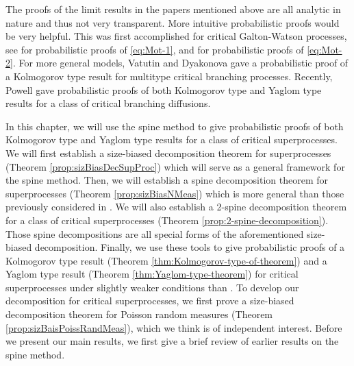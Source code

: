 \documentclass[UTF8]{pkuthss}
\theoremstyle{plain}
\theoremstyle{definition}
\numberwithin{equation}{section}
\begin{document}
	The proofs of the limit results in the papers mentioned above 
	are all analytic in nature and thus not very transparent.
	More intuitive probabilistic proofs would be very helpful.
	This was first accomplished for critical Galton-Watson processes, see \cite{Geiger1999Elementary, LyonsPemantlePeres1995Conceptual} for probabilistic proofs of \eqref{eq:Mot-1}, and \cite{Geiger2000New, LyonsPemantlePeres1995Conceptual, RenSongSun20182spine} for probabilistic proofs of \eqref{eq:Mot-2}.
	For more general models, Vatutin and Dyakonova \cite{VatutinDyakonova2001Survival} gave a probabilistic proof of a Kolmogorov type result for multitype critical branching processes.
	Recently, Powell \cite{Powell2019Invariance} gave probabilistic proofs of both Kolmogorov type and Yaglom type results for a class of critical branching diffusions. 
	

	In this chapter, we will use the spine method to give probabilistic proofs of both Kolmogorov type and Yaglom type results for a class of critical superprocesses. 
	We will first establish a size-biased decomposition theorem for superprocesses (Theorem \ref{prop:sizBiasDecSupProc}) which will serve as a general framework for the spine method.
	Then, we will establish a spine decomposition theorem for superprocesses (Theorem \ref{prop:sizBiasNMeas}) which is more general than those previously considered in \cite{EckhoffKyprianouWinkel2015Spines, EnglanderKyprianou2004Local, LiuRenSong2009Log}.
	We will also establish a 2-spine decomposition theorem for a class of critical superprocesses (Theorem \ref{prop:2-spine-decomposition}).
	Those spine decompositions are all special forms of
		the aforementioned size-biased decomposition.
	Finally, we use these tools to give probabilistic proofs of a Kolmogorov type result (Theorem \ref{thm:Kolmogorov-type-of-theorem}) and a Yaglom type result (Theorem \ref{thm:Yaglom-type-theorem}) 
for critical superprocesses under slightly weaker conditions than \cite{RenSongZhang2015Limit}.
To develop our decomposition for critical superprocesses, we first prove a size-biased decomposition theorem for Poisson random measures (Theorem \ref{prop:sizBaisPoissRandMeas}),
which we think is of independent interest.
Before we present our main results, we first give a brief review of earlier results on the spine method.
	
\end{document}
